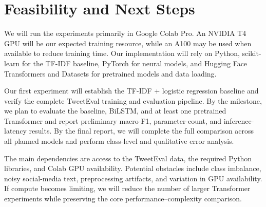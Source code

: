 \documentclass[12pt]{extarticle}
\begin{document}
\section{Feasibility and Next Steps}

We will run the experiments primarily in Google Colab Pro. An NVIDIA T4 GPU will be
our expected training resource, while an A100 may be used when available to reduce
training time. Our implementation will rely on Python, scikit-learn for the TF-IDF
baseline, PyTorch for neural models, and Hugging Face Transformers and Datasets for
pretrained models and data loading.

Our first experiment will establish the TF-IDF + logistic regression baseline and
verify the complete TweetEval training and evaluation pipeline. By the milestone, we
plan to evaluate the baseline, BiLSTM, and at least one pretrained Transformer and
report preliminary macro-F1, parameter-count, and inference-latency results. By the
final report, we will complete the full comparison across all planned models and perform
class-level and qualitative error analysis.

The main dependencies are access to the TweetEval data, the required Python libraries,
and Colab GPU availability. Potential obstacles include class imbalance, noisy
social-media text, preprocessing artifacts, and variation in GPU availability. If
compute becomes limiting, we will reduce the number of larger Transformer experiments
while preserving the core performance--complexity comparison.



\end{document}
